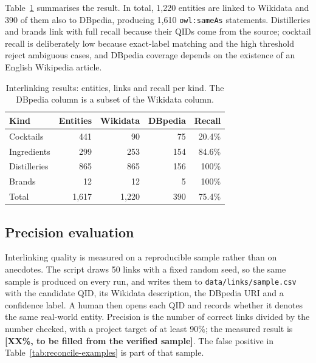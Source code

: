 Table~\ref{tab:links} summarises the result. In total, 1{,}220 entities are
linked to Wikidata and 390 of them also to DBpedia, producing 1{,}610
\texttt{owl:sameAs} statements. Distilleries and brands link with full recall
because their QIDs come from the source; cocktail recall is deliberately low
because exact-label matching and the high threshold reject ambiguous cases, and
DBpedia coverage depends on the existence of an English Wikipedia article.

\begin{table}[h]
  \centering
  \small
  \begin{tabular}{@{}lrrrr@{}}
    \toprule
    Kind & Entities & Wikidata & DBpedia & Recall \\
    \midrule
    Cocktails & 441 & 90 & 75 & 20.4\% \\
    Ingredients & 299 & 253 & 154 & 84.6\% \\
    Distilleries & 865 & 865 & 156 & 100\% \\
    Brands & 12 & 12 & 5 & 100\% \\
    \midrule
    Total & 1{,}617 & 1{,}220 & 390 & 75.4\% \\
    \bottomrule
  \end{tabular}
  \caption{Interlinking results: entities, links and recall per kind. The
  DBpedia column is a subset of the Wikidata column.}
  \label{tab:links}
\end{table}

\subsection{Precision evaluation}

Interlinking quality is measured on a reproducible sample rather than on
anecdotes. The script draws 50 links with a fixed random seed, so the same
sample is produced on every run, and writes them to
\texttt{data/links/sample.csv} with the candidate QID, its Wikidata
description, the DBpedia URI and a confidence label. A human then opens each
QID and records whether it denotes the same real-world entity. Precision is the
number of correct links divided by the number checked, with a project target of
at least 90\%; the measured result is \textbf{[XX\%, to be filled from the
verified sample]}. The false positive in Table~\ref{tab:reconcile-examples} is
part of that sample.

